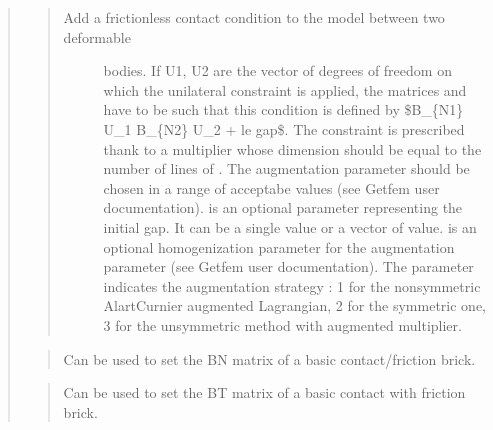 \documentclass[a4paper,11pt,english]{sphinxmanual}
\begin{document}
\begin{quote}
\begin{quote}
\begin{description}
\item[{Add a frictionless contact condition to the model between two deformable}] \leavevmode
bodies. If U1, U2 are the vector
of degrees of freedom on which the unilateral constraint is applied,
the matrices  and  have to be such that this condition
is defined by
\$B\_\{N1\} U\_1 B\_\{N2\} U\_2 + le gap\$. The constraint is prescribed thank
to a multiplier
 whose dimension should be equal to the number of lines of
. The augmentation parameter  should be chosen in a range of
acceptabe values (see Getfem user documentation).  is an
optional parameter representing the initial gap. It can be a single value
or a vector of value.  is an optional homogenization
parameter for the augmentation parameter
(see Getfem user documentation). The parameter  indicates
the augmentation strategy : 1 for the non\sphinxhyphen{}symmetric Alart\sphinxhyphen{}Curnier
augmented Lagrangian, 2 for the symmetric one, 3 for the unsymmetric
method with augmented multiplier.

\end{description}
\end{quote}

\begin{quote}

Can be used to set the BN matrix of a basic contact/friction brick.
\end{quote}

\begin{quote}

Can be used to set the BT matrix of a basic contact with
friction brick.
\end{quote}


\end{quote}
\end{document}
